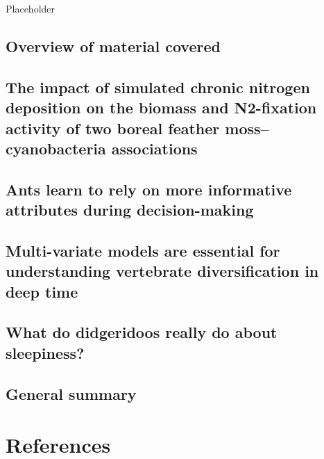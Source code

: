 \documentclass[]{book}
\begin{document}
Placeholder

\hypertarget{section9-1}{%
\section{Overview of material covered}\label{section9-1}}

\hypertarget{section9-2}{%
\section{The impact of simulated chronic nitrogen deposition on the biomass and N2-fixation activity of two boreal feather moss--cyanobacteria associations}\label{section9-2}}

\hypertarget{section9-3}{%
\section{Ants learn to rely on more informative attributes during decision-making}\label{section9-3}}

\hypertarget{section9-4}{%
\section{Multi-variate models are essential for understanding vertebrate diversification in deep time}\label{section9-4}}

\hypertarget{section9-5}{%
\section{What do didgeridoos really do about sleepiness?}\label{section9-5}}

\hypertarget{section9-6}{%
\section{General summary}\label{section9-6}}

\hypertarget{references}{%
\chapter*{References}\label{references}}



\cleardoublepage
\printindex{}
\end{document}
